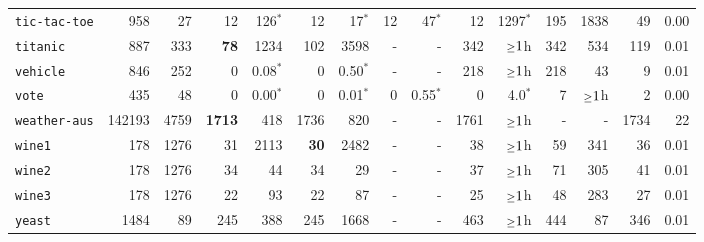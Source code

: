 \begin{tabular}{lccrrrrrrrrrrrr}
\texttt{tic-tac-toe} & \multicolumn{1}{r}{958} & \multicolumn{1}{r}{27}  & 12 & 126$^*$ & 12 & 17$^*$ & 12 & 47$^*$ & 12 & 1297$^*$ & 195 & 1838 & 49 & 0.00\\
\texttt{titanic} & \multicolumn{1}{r}{887} & \multicolumn{1}{r}{333}  & \textbf{78} & 1234 & 102 & 3598 & - & - & 342 & $\mathsmaller{\geq}1$h & 342 & 534 & 119 & 0.01\\
\texttt{vehicle} & \multicolumn{1}{r}{846} & \multicolumn{1}{r}{252}  & 0 & 0.08$^*$ & 0 & 0.50$^*$ & - & - & 218 & $\mathsmaller{\geq}1$h & 218 & 43 & 9 & 0.01\\
\texttt{vote} & \multicolumn{1}{r}{435} & \multicolumn{1}{r}{48}  & 0 & 0.00$^*$ & 0 & 0.01$^*$ & 0 & 0.55$^*$ & 0 & 4.0$^*$ & 7 & $\mathsmaller{\geq}1$h & 2 & 0.00\\
\texttt{weather-aus} & \multicolumn{1}{r}{142193} & \multicolumn{1}{r}{4759}  & \textbf{1713} & 418 & 1736 & 820 & - & - & 1761 & $\mathsmaller{\geq}1$h & - & - & 1734 & 22\\
\texttt{wine1} & \multicolumn{1}{r}{178} & \multicolumn{1}{r}{1276}  & 31 & 2113 & \textbf{30} & 2482 & - & - & 38 & $\mathsmaller{\geq}1$h & 59 & 341 & 36 & 0.01\\
\texttt{wine2} & \multicolumn{1}{r}{178} & \multicolumn{1}{r}{1276}  & 34 & 44 & 34 & 29 & - & - & 37 & $\mathsmaller{\geq}1$h & 71 & 305 & 41 & 0.01\\
\texttt{wine3} & \multicolumn{1}{r}{178} & \multicolumn{1}{r}{1276}  & 22 & 93 & 22 & 87 & - & - & 25 & $\mathsmaller{\geq}1$h & 48 & 283 & 27 & 0.01\\
\texttt{yeast} & \multicolumn{1}{r}{1484} & \multicolumn{1}{r}{89}  & 245 & 388 & 245 & 1668 & - & - & 463 & $\mathsmaller{\geq}1$h & 444 & 87 & 346 & 0.01\\
\bottomrule
\end{tabular}
